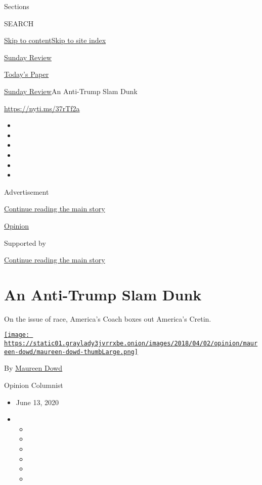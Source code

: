 Sections

SEARCH

\protect\hyperlink{site-content}{Skip to
content}\protect\hyperlink{site-index}{Skip to site index}

\href{https://www.nytimes3xbfgragh.onion/section/opinion/sunday}{Sunday
Review}

\href{https://myaccount.nytimes3xbfgragh.onion/auth/login?response_type=cookie\&client_id=vi}{}

\href{https://www.nytimes3xbfgragh.onion/section/todayspaper}{Today's
Paper}

\href{/section/opinion/sunday}{Sunday Review}\textbar{}An Anti-Trump
Slam Dunk

\href{https://nyti.ms/37rTf2a}{https://nyti.ms/37rTf2a}

\begin{itemize}
\item
\item
\item
\item
\item
\item
\end{itemize}

Advertisement

\protect\hyperlink{after-top}{Continue reading the main story}

\href{/section/opinion}{Opinion}

Supported by

\protect\hyperlink{after-sponsor}{Continue reading the main story}

\hypertarget{an-anti-trump-slam-dunk}{%
\section{An Anti-Trump Slam Dunk}\label{an-anti-trump-slam-dunk}}

On the issue of race, America's Coach boxes out America's Cretin.

\href{https://www.nytimes3xbfgragh.onion/by/maureen-dowd}{\texttt{[image: https://static01.graylady3jvrrxbe.onion/images/2018/04/02/opinion/maureen-dowd/maureen-dowd-thumbLarge.png]}}

By \href{https://www.nytimes3xbfgragh.onion/by/maureen-dowd}{Maureen
Dowd}

Opinion Columnist

\begin{itemize}
\item
  June 13, 2020
\item
  \begin{itemize}
  \item
  \item
  \item
  \item
  \item
  \item
  \end{itemize}
\end{itemize}

